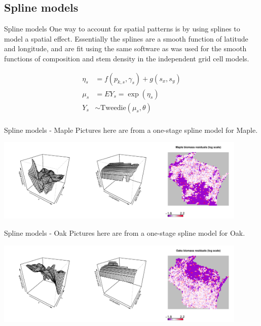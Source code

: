 \documentclass{beamer}
\begin{document}
\subsection{Spline models}
\begin{frame}{Spline models}
  One way to account for spatial patterns is by using splines to model a spatial effect. Essentially the splines are a smooth function of latitude and longitude, and are fit using the same software as was used for the smooth functions of composition and stem density in the independent grid cell models.
  
  \begin{align*}
      \eta_s &= f(p_{k,s}, \gamma_s) + g(s_x, s_y)\\
      \mu_s &= EY_s = \exp{(\eta_s)}\\
      Y_s &\sim \text{Tweedie}(\mu_s, \theta)\\
  \end{align*}
\end{frame}

\begin{frame}{Spline models - Maple}
 Pictures here are from a one-stage spline model for Maple.\\
  \begin{center}
    \includegraphics[width=0.9\textwidth]{../../figures/spline-tweedie/Maple-residuals-heatmap.pdf}
  \end{center}
\end{frame}

\begin{frame}{Spline models - Oak}
 Pictures here are from a one-stage spline model for Oak.\\
  \begin{center}
    \includegraphics[width=0.9\textwidth]{../../figures/spline-tweedie/Oaks-residuals-heatmap.pdf}
  \end{center}
\end{frame}
\end{document}
